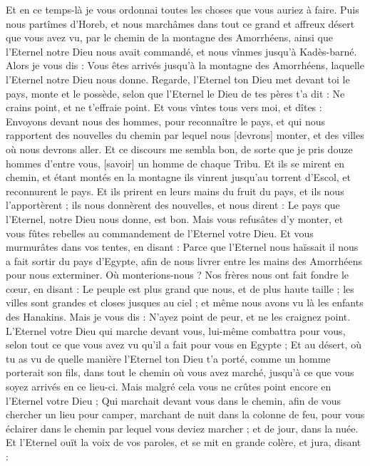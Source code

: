 \begin{multicols}{2}
Et en ce temps-là je vous ordonnai toutes les choses que vous auriez à faire.
Puis nous partîmes d'Horeb, et nous marchâmes dans tout ce grand et affreux désert que vous avez vu, par le chemin de la montagne des Amorrhéens, ainsi que l'Eternel notre Dieu nous avait commandé, et nous vînmes jusqu'à Kadès-barné.
Alors je vous dis : Vous êtes arrivés jusqu'à la montagne des Amorrhéens, laquelle l'Eternel notre Dieu nous donne.
Regarde, l'Eternel ton Dieu met devant toi le pays, monte et le possède, selon que l'Eternel le Dieu de tes pères t'a dit : Ne crains point, et ne t'effraie point.
Et vous vîntes tous vers moi, et dîtes : Envoyons devant nous des hommes, pour reconnaître le pays, et qui nous rapportent des nouvelles du chemin par lequel nous [devrons] monter, et des villes où nous devrons aller.
Et ce discours me sembla bon, de sorte que je pris douze hommes d'entre vous, [savoir] un homme de chaque Tribu.
Et ils se mirent en chemin, et étant montés en la montagne ils vinrent jusqu'au torrent d'Escol, et reconnurent le pays.
Et ils prirent en leurs mains du fruit du pays, et ils nous l'apportèrent ; ils nous donnèrent des nouvelles, et nous dirent : Le pays que l'Eternel, notre Dieu nous donne, est bon.
Mais vous refusâtes d'y monter, et vous fûtes rebelles au commandement de l'Eternel votre Dieu.
Et vous murmurâtes dans vos tentes, en disant : Parce que l'Eternel nous haïssait il nous a fait sortir du pays d'Egypte, afin de nous livrer entre les mains des Amorrhéens pour nous exterminer.
Où monterions-nous ? Nos frères nous ont fait fondre le cœur, en disant : Le peuple est plus grand que nous, et de plus haute taille ; les villes sont grandes et closes jusques au ciel ; et même nous avons vu là les enfants des Hanakins.
Mais je vous dis : N'ayez point de peur, et ne les craignez point.
L'Eternel votre Dieu qui marche devant vous, lui-même combattra pour vous, selon tout ce que vous avez vu qu'il a fait pour vous en Egypte ;
Et au désert, où tu as vu de quelle manière l'Eternel ton Dieu t'a porté, comme un homme porterait son fils, dans tout le chemin où vous avez marché, jusqu'à ce que vous soyez arrivés en ce lieu-ci.
Mais malgré cela vous ne crûtes point encore en l'Eternel votre Dieu ;
Qui marchait devant vous dans le chemin, afin de vous chercher un lieu pour camper, marchant de nuit dans la colonne de feu, pour vous éclairer dans le chemin par lequel vous deviez marcher ; et de jour, dans la nuée.
Et l'Eternel ouït la voix de vos paroles, et se mit en grande colère, et jura, disant :

\end{multicols}
